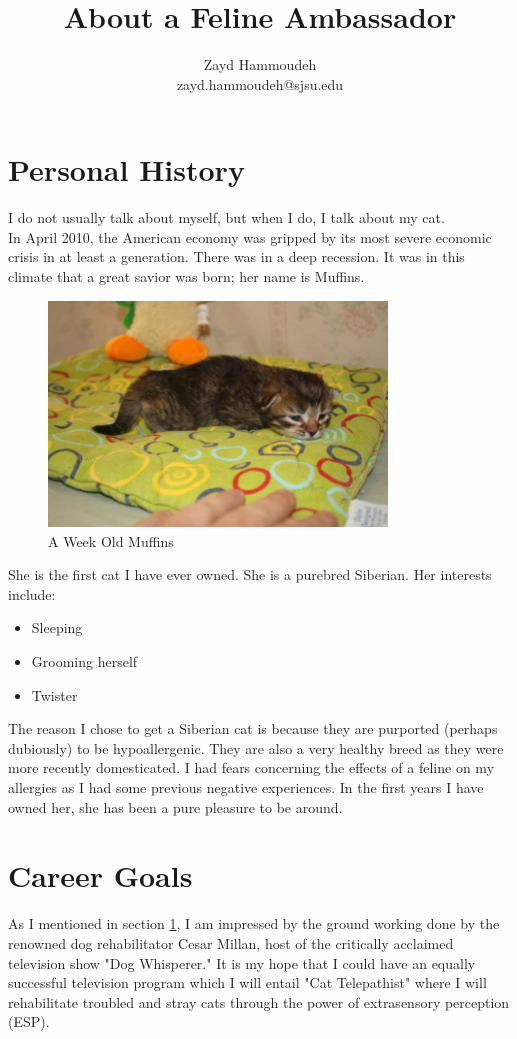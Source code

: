 \documentclass{article}
\title{About a Feline Ambassador}
\author{
	Zayd Hammoudeh \\
	zayd.hammoudeh@sjsu.edu
}
\begin{document}
\maketitle


\section{Personal History}\label{my_history}
I do not usually talk about myself, but when I do, I talk about my cat.\\

In April 2010, the American economy was gripped by its most severe economic crisis in at least a generation.  There was in a deep recession.  It was in this climate that a great savior was born; her name is Muffins.  

\begin{figure}[ht!]
\centering
\includegraphics[width=90mm]{./images/muffins.jpg}
\caption{A Week Old Muffins}
\end{figure}

She is the first cat I have ever owned.  She is a purebred Siberian.  Her interests include: \\
\begin{itemize}
	\item Sleeping
	\item Grooming herself
	\item Twister
\end{itemize}

The reason I chose to get a Siberian cat is because they are purported (perhaps dubiously) to be hypoallergenic. They are also a very healthy breed as they were more recently domesticated.  I had fears concerning the effects of a feline on my allergies as I had some previous negative experiences.  In the first years I have owned her, she has been a pure pleasure to be around.

\section{Career Goals}
As I mentioned in section \ref{my_history}, I am impressed by the ground working done by the renowned dog rehabilitator Cesar Millan, host of the critically acclaimed television show "Dog Whisperer." It is my hope that I could have an equally successful television program which I will entail "Cat Telepathist"  where I will rehabilitate troubled and stray cats through the power of extrasensory perception (ESP).\\
\end{document}
